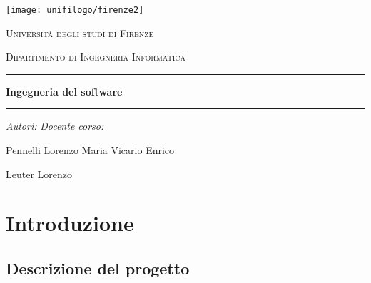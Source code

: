 \documentclass[10pt]{article}
\begin{document}
\par\medskip
\begin{center}
\texttt{[image: unifilogo/firenze2]}
\end{center}

\begin{center}
\par\medskip
\textsc{{\large Università degli studi di Firenze}}\\
\par\medskip
\textsc{{\normalsize Dipartimento di Ingegneria Informatica}}\\
\par\medskip
\par\medskip
\hrule width 12cm height 1pt \par
\par\medskip
\par\medskip
\par\medskip
{\Large \textbf{Ingegneria del software}}\\
\par\medskip
\par\medskip
\par\medskip
\hrule width 12cm height 1pt \par
\par\medskip
\par\medskip
\par\medskip
\emph{Autori:} \hfill \emph{Docente corso:}\\
\par\medskip
Pennelli Lorenzo Maria \hfill Vicario Enrico\\
\begin{FlushLeft}
Leuter Lorenzo\\
\end{FlushLeft}

\end{center}

\newpage

\tableofcontents

\newpage

\section{Introduzione}

\subsection{Descrizione del progetto}
\end{document}
